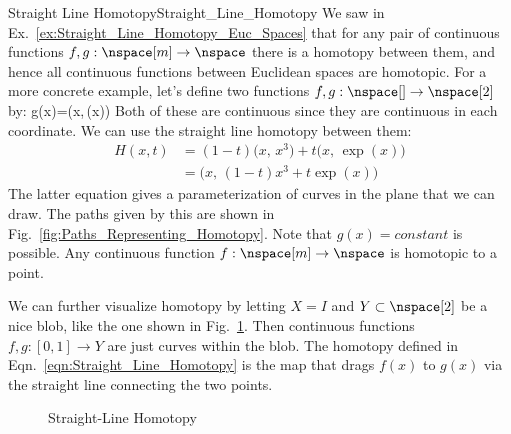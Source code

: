 \documentclass[oneside]{book}                                                  %
\begin{document}
                \begin{lexample}{Straight Line Homotopy}{Straight_Line_Homotopy}
                    We saw in Ex.~\ref{ex:Straight_Line_Homotopy_Euc_Spaces}
                    that for any pair of continuous functions
                    $f,g:\nspace[m]\rightarrow\nspace$ there is a homotopy
                    between them, and hence all continuous functions between
                    Euclidean spaces are homotopic. For a more concrete example,
                    let's define two functions
                    $f,g:\nspace[]\rightarrow\nspace[2]$ by:
                                {g(x)=\big(x,\,\exp(x)\big)}
                    Both of these are continuous since they are continuous in
                    each coordinate. We can use the straight line homotopy
                    between them:
                    \begin{subequations}
                        \begin{align}
                            H(x,t)
                            &=(1-t)\big(x,\,x^{3}\big)+t\big(x,\,\exp(x)\big)\\
                            &=\big(x,\,(1-t)x^{3}+t\exp(x)\big)
                        \end{align}
                    \end{subequations}
                    The latter equation gives a parameterization of curves in
                    the plane that we can draw. The paths given by this are
                    shown in Fig.~\ref{fig:Paths_Representing_Homotopy}.
                    Note that $g(x)=constant$ is possible. Any continuous
                    function $f:\nspace[m]\rightarrow\nspace$ is homotopic to a
                    point.
                \end{lexample}
                We can further visualize homotopy by letting $X=I$ and
                $Y\subset\nspace[2]$ be a nice blob, like the one shown in
                Fig.~\ref{fig:straight_line_homotopy}. Then continuous functions
                $f,g:[0,1]\rightarrow{Y}$ are just curves within the blob. The
                homotopy defined in Eqn.~\ref{eqn:Straight_Line_Homotopy} is the
                map that drags $f(x)$ to $g(x)$ via the straight line connecting
                the two points.
                \begin{figure}[H]
                    \centering
                    \captionsetup{type=figure}
                    
                    \caption{Straight-Line Homotopy}
                    \label{fig:straight_line_homotopy}
                \end{figure}
\end{document}

